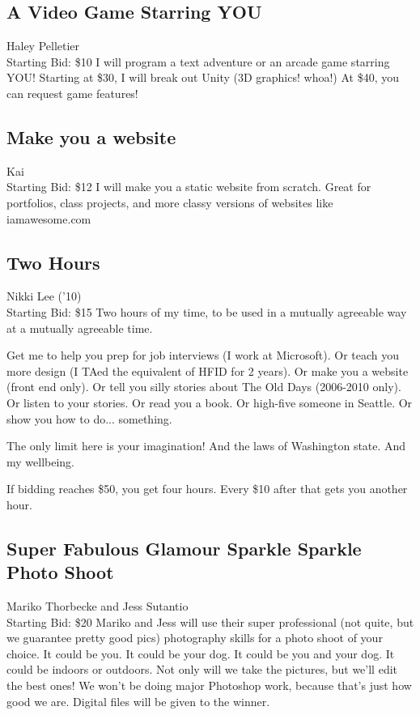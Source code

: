 \documentclass[11pt]{article}
\begin{document}
\subsection{A Video Game Starring YOU}
Haley Pelletier
\\
Starting Bid: \$10
\newline
I will program a text adventure or an arcade game starring YOU!  Starting at \$30, I will break out Unity (3D graphics! whoa!)  At \$40, you can request game features!
\subsection{Make you a website}
Kai
\\
Starting Bid: \$12
\newline
I will make you a static website from scratch. Great for portfolios, class projects, and more classy versions of websites like iamawesome.com
\subsection{Two Hours}
Nikki Lee ('10)
\\
Starting Bid: \$15
\newline
Two hours of my time, to be used in a mutually agreeable way at a mutually agreeable time.

Get me to help you prep for job interviews (I work at Microsoft). Or teach you more design (I TAed the equivalent of HFID for 2 years). Or make you a website (front end only). Or tell you silly stories about The Old Days (2006-2010 only). Or listen to your stories. Or read you a book. Or high-five someone in Seattle. Or show you how to do... something.

The only limit here is your imagination! And the laws of Washington state. And my wellbeing.


If bidding reaches \$50, you get four hours. Every \$10 after that gets you another hour.
\subsection{Super Fabulous Glamour Sparkle Sparkle Photo Shoot}
Mariko Thorbecke and Jess Sutantio
\\
Starting Bid: \$20
\newline
Mariko and Jess will use their super professional (not quite, but we guarantee pretty good pics) photography skills for a photo shoot of your choice. It could be you. It could be your dog. It could be you and your dog. It could be indoors or outdoors. Not only will we take the pictures, but we'll edit the best ones! We won't be doing major Photoshop work, because that's just how good we are. Digital files will be given to the winner. 
\end{document}
